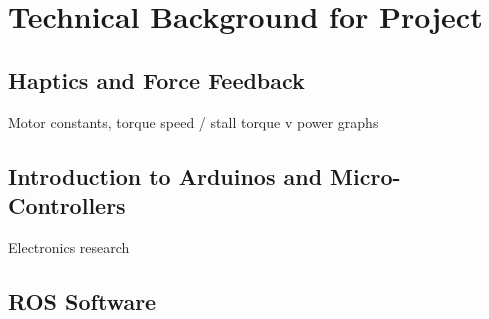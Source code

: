 \section{Technical Background for Project}
\label{sec:technical_background_for_project}

\subsection{Haptics and Force Feedback}
\label{sub:haptics_and_force_feedback}

Motor constants, torque speed / stall torque v power graphs


\subsection{Introduction to Arduinos and Micro-Controllers}
\label{sub:introduction_to_arduinos_and_micro_controllers}

Electronics research


\subsection{ROS Software}
\label{sub:ros_software}

